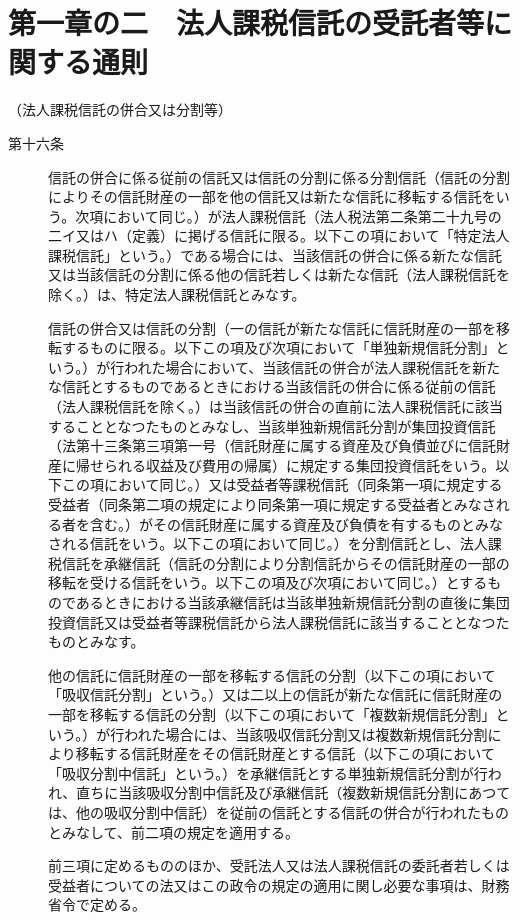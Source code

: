 \documentclass[twocolumn,a4j,10pt]{ltjtarticle}
\begin{document}
\section*{第一章の二　法人課税信託の受託者等に関する通則}
\noindent\hspace{10pt}（法人課税信託の併合又は分割等）
\begin{description}
\item[第十六条]信託の併合に係る従前の信託又は信託の分割に係る分割信託（信託の分割によりその信託財産の一部を他の信託又は新たな信託に移転する信託をいう。次項において同じ。）が法人課税信託（法人税法第二条第二十九号の二イ又はハ（定義）に掲げる信託に限る。以下この項において「特定法人課税信託」という。）である場合には、当該信託の併合に係る新たな信託又は当該信託の分割に係る他の信託若しくは新たな信託（法人課税信託を除く。）は、特定法人課税信託とみなす。
\item[]信託の併合又は信託の分割（一の信託が新たな信託に信託財産の一部を移転するものに限る。以下この項及び次項において「単独新規信託分割」という。）が行われた場合において、当該信託の併合が法人課税信託を新たな信託とするものであるときにおける当該信託の併合に係る従前の信託（法人課税信託を除く。）は当該信託の併合の直前に法人課税信託に該当することとなつたものとみなし、当該単独新規信託分割が集団投資信託（法第十三条第三項第一号（信託財産に属する資産及び負債並びに信託財産に帰せられる収益及び費用の帰属）に規定する集団投資信託をいう。以下この項において同じ。）又は受益者等課税信託（同条第一項に規定する受益者（同条第二項の規定により同条第一項に規定する受益者とみなされる者を含む。）がその信託財産に属する資産及び負債を有するものとみなされる信託をいう。以下この項において同じ。）を分割信託とし、法人課税信託を承継信託（信託の分割により分割信託からその信託財産の一部の移転を受ける信託をいう。以下この項及び次項において同じ。）とするものであるときにおける当該承継信託は当該単独新規信託分割の直後に集団投資信託又は受益者等課税信託から法人課税信託に該当することとなつたものとみなす。
\item[]他の信託に信託財産の一部を移転する信託の分割（以下この項において「吸収信託分割」という。）又は二以上の信託が新たな信託に信託財産の一部を移転する信託の分割（以下この項において「複数新規信託分割」という。）が行われた場合には、当該吸収信託分割又は複数新規信託分割により移転する信託財産をその信託財産とする信託（以下この項において「吸収分割中信託」という。）を承継信託とする単独新規信託分割が行われ、直ちに当該吸収分割中信託及び承継信託（複数新規信託分割にあつては、他の吸収分割中信託）を従前の信託とする信託の併合が行われたものとみなして、前二項の規定を適用する。
\item[]前三項に定めるもののほか、受託法人又は法人課税信託の委託者若しくは受益者についての法又はこの政令の規定の適用に関し必要な事項は、財務省令で定める。
\end{description}
\end{document}
